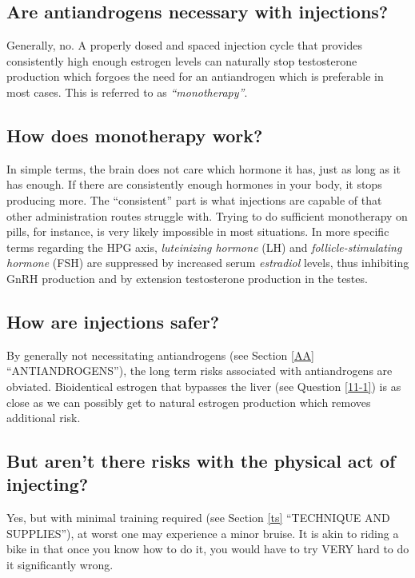\documentclass{article}
\begin{document}
\subsection{Are antiandrogens necessary with injections?}

Generally, no. A properly dosed and spaced injection cycle that provides consistently high enough estrogen levels can naturally stop testosterone production which forgoes the need for an antiandrogen which is preferable in most cases. This is referred to as \textit{“monotherapy”}.

\subsection{How does monotherapy work?}\label{2-3}

In simple terms, the brain does not care which hormone it has, just as long as it has enough. If there are consistently enough hormones in your body, it stops producing more. The “consistent” part is what injections are capable of that other administration routes struggle with. Trying to do sufficient monotherapy on pills, for instance, is very likely impossible in most situations. In more specific terms regarding the HPG axis, \textit{luteinizing hormone} (LH) and \textit{follicle-stimulating hormone} (FSH) are suppressed by increased serum \textit{estradiol} levels, thus inhibiting GnRH production and by extension testosterone production in the testes.

\subsection{How are injections safer?}

By generally not necessitating antiandrogens (see Section \ref{AA} “ANTIANDROGENS”), the long term risks associated with antiandrogens are obviated. Bioidentical estrogen that bypasses the liver (see Question \ref{11-1}) is as close as we can possibly get to natural estrogen production which removes additional risk.

\subsection{But aren’t there risks with the physical act of injecting?}

Yes, but with minimal training required (see Section \ref{ts} “TECHNIQUE AND SUPPLIES”), at worst one may experience a minor bruise. It is akin to riding a bike in that once you know how to do it, you would have to try VERY hard to do it significantly wrong.
\end{document}
